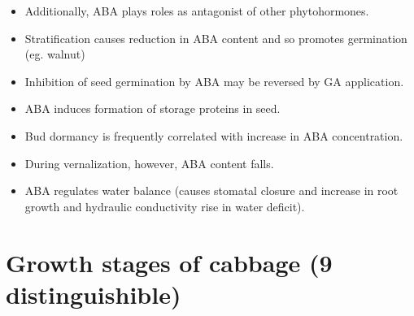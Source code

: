 \documentclass[
  openany]{book}
\providecommand{\tightlist}{%
  \setlength{\itemsep}{0pt}\setlength{\parskip}{0pt}}
\begin{document}
\begin{itemize}
\tightlist
\item
  Additionally, ABA plays roles as antagonist of other phytohormones.
\item
  Stratification causes reduction in ABA content and so promotes germination (eg. walnut)
\item
  Inhibition of seed germination by ABA may be reversed by GA application.
\item
  ABA induces formation of storage proteins in seed.
\item
  Bud dormancy is frequently correlated with increase in ABA concentration.
\item
  During vernalization, however, ABA content falls.
\item
  ABA regulates water balance (causes stomatal closure and increase in root growth and hydraulic conductivity rise in water deficit).
\end{itemize}

\hypertarget{growth-stages-of-cabbage-9-distinguishible}{%
\section{Growth stages of cabbage (9 distinguishible)}\label{growth-stages-of-cabbage-9-distinguishible}}
\end{document}
